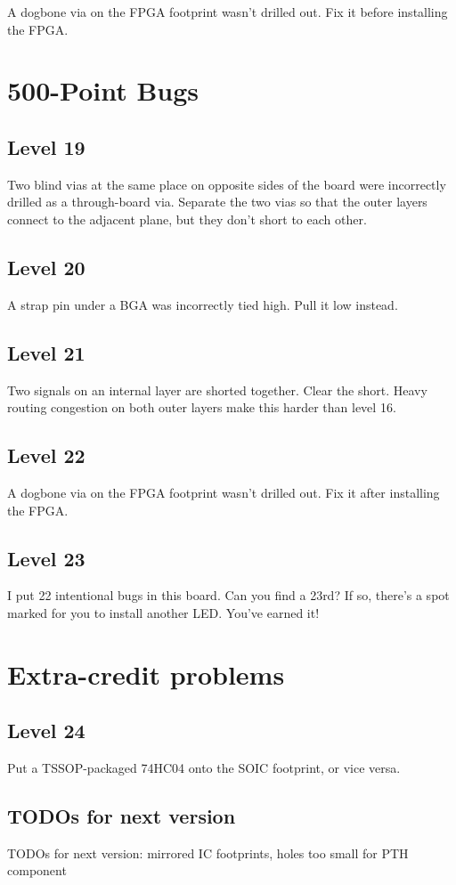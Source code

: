 \documentclass{article}
\begin{document}
A dogbone via on the FPGA footprint wasn't drilled out. Fix it before installing the FPGA.

\pagebreak
\section{500-Point Bugs}

\subsection{Level 19}

Two blind vias at the same place on opposite sides of the board were incorrectly drilled as a through-board via.
Separate the two vias so that the outer layers connect to the adjacent plane, but they don't short to each other.

\subsection{Level 20}

A strap pin under a BGA was incorrectly tied high. Pull it low instead.

\subsection{Level 21}

Two signals on an internal layer are shorted together. Clear the short. Heavy routing congestion on both outer layers
make this harder than level 16.

\subsection{Level 22}

A dogbone via on the FPGA footprint wasn't drilled out. Fix it after installing the FPGA.

\subsection{Level 23}

I put 22 intentional bugs in this board. Can you find a 23rd? If so, there's a spot marked for you to install another
LED. You've earned it!

\pagebreak
\section{Extra-credit problems}

\subsection{Level 24}

Put a TSSOP-packaged 74HC04 onto the SOIC footprint, or vice versa.

\subsection{TODOs for next version}

TODOs for next version: mirrored IC footprints, holes too small for PTH component
\end{document}

